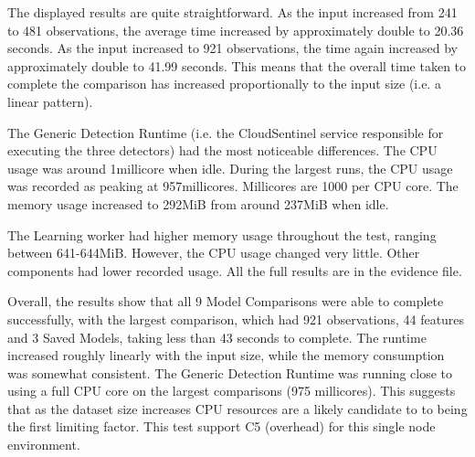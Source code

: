 

The displayed results are quite straightforward. As the input increased from 241 to 481 observations, the average time increased by approximately double to 20.36 seconds. As the input increased to 921 observations, the time again increased by approximately double to 41.99 seconds. This means that the overall time taken to complete the comparison has increased proportionally to the input size (i.e. a linear pattern).

The Generic Detection Runtime (i.e. the CloudSentinel service responsible for executing the three detectors) had the most noticeable differences. The CPU usage was around 1millicore when idle. During the largest runs, the CPU usage was recorded as peaking at 957millicores. Millicores are 1000 per CPU core. The memory usage increased to 292MiB from around 237MiB when idle.

The Learning worker had higher memory usage throughout the test, ranging between 641-644MiB. However, the CPU usage changed very little. Other components had lower recorded usage. All the full results are in the evidence file.


Overall, the results show that all 9 Model Comparisons were able to complete successfully, with the largest comparison, which had 921 observations, 44 features and 3 Saved Models, taking less than 43 seconds to complete. The runtime increased roughly linearly with the input size, while the memory consumption was somewhat  consistent. The Generic Detection Runtime was running close to using a full CPU core on the largest comparisons (975 millicores). This suggests that as the dataset size increases CPU resources are a likely candidate to to being the first limiting factor. This test support C5 (overhead) for this single node environment.

